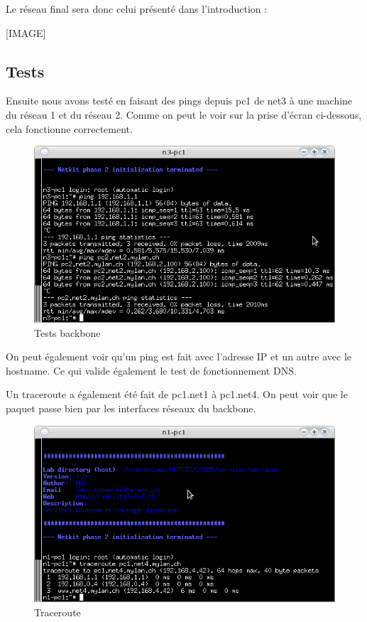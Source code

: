 \documentclass{article}
\begin{document}
Le réseau final sera donc celui présenté dans l'introduction : 

[IMAGE]

\subsection{Tests}

Ensuite nous avons testé en faisant des pings depuis pc1 de net3 à une machine du réseau 1 et du réseau 2. Comme on peut le voir sur la prise d'écran ci-dessous, cela fonctionne correctement.

\begin{figure}[h]
	\centering
	\includegraphics{./captures/test-zebra-from-pc.png}
	\caption{Tests backbone}
	\label{fig:Tests backbone}
\end{figure}

On peut également voir qu'un ping est fait avec l'adresse IP et un autre avec le hostname. Ce qui valide également le test de fonctionnement DNS.

Un traceroute a également été fait de pc1.net1 à pc1.net4. On peut voir que le paquet passe bien par les interfaces réseaux du backbone.

\begin{figure}[h]
	\centering
	\includegraphics{./captures/traceroutepc1-net4.png}
	\caption{Traceroute}
	\label{fig:Traceroute}
\end{figure}
\end{document}
